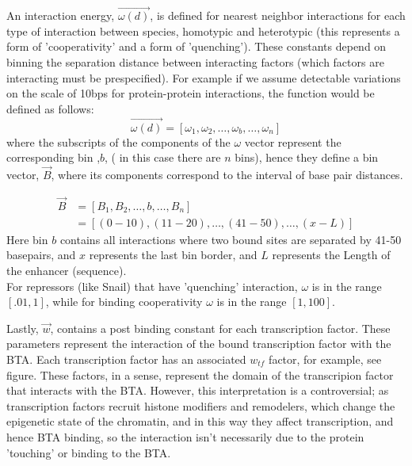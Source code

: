 An interaction energy,  $\overrightarrow{\omega(d)}$, is defined for nearest neighbor interactions for each type of interaction between species, homotypic and heterotypic (this represents a form of 'cooperativity' and a form of 'quenching').  These constants depend on binning the separation distance between interacting factors (which factors are interacting must be prespecified).  For example if we assume detectable variations on the scale of 10bps for protein-protein interactions, the function would be defined as follows:
\begin{equation}\label{}
   \overrightarrow{ \omega(d)} =  [ \omega_1 ,\omega_2 ,\ldots, \omega_b,\ldots,  \omega_n ]
\end{equation}
where the subscripts of the components of the $\omega$ vector represent the corresponding bin ,$b$, ( in this case there are $n$ bins), hence they define a bin vector, $\overrightarrow{B}$, where its components correspond to the interval of base pair distances.

\begin{equation}\label{}
\begin{split}
 \overrightarrow{B}   &= [ B_1 ,B_2 ,\ldots, b, \ldots, B_n ] \\
     &=   [ (0-10), (11-20), \ldots,(41-50),\ldots, (x-L)]
    \end{split}
\end{equation}
Here bin $b$ contains all interactions where two bound sites are separated by 41-50 basepairs, and $x$ represents the last bin border, and $L$ represents the Length of the enhancer (sequence). \\

For repressors (like Snail) that have 'quenching' interaction, $\omega$ is in the range $[.01,1]$, while for binding cooperativity $\omega$ is in the range $[1,100]$.

Lastly, $\overrightarrow{w}$, contains a post binding constant for each transcription factor.  These parameters represent the interaction of the bound transcription factor with the BTA.  Each transcription factor has an associated $w_{tf}$ factor, for example, see figure.  These factors, in a sense, represent the domain of the transcripion factor that interacts with the BTA.  However, this interpretation is a controversial; as transcription factors recruit histone modifiers and remodelers, which change the epigenetic state of the chromatin, and in this way they affect transcription, and hence BTA binding, so the interaction isn't necessarily due to the protein 'touching' or binding to the BTA.  
  
